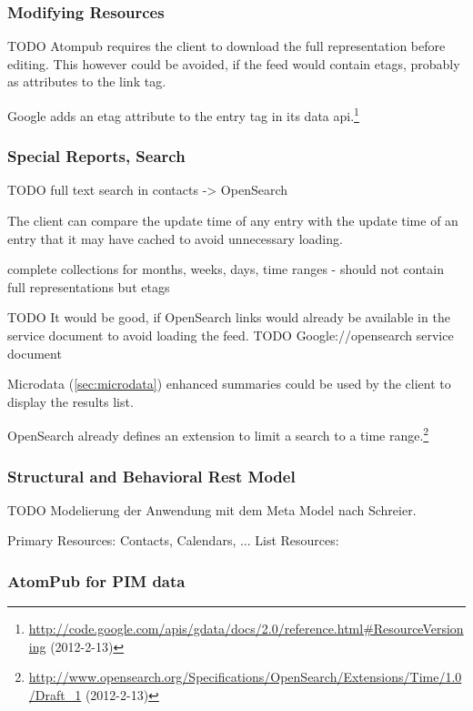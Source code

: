 \documentclass[12pt,a4paper]{scrartcl}		%
\newcommand{\citeurl}[2]{\url{#1} (#2)}
\begin{document}
\subsubsection{Modifying Resources}

TODO Atompub requires the client to download the full representation before
editing. This however could be avoided, if the feed would contain etags,
probably as attributes to the link tag.

Google adds an etag attribute to the entry tag in its data api.\footnote{\citeurl{http://code.google.com/apis/gdata/docs/2.0/reference.html\#ResourceVersioning}{2012-2-13}}

\subsubsection{Special Reports, Search}
TODO 
full text search in contacts -> OpenSearch

The client can compare the update time of any entry with the update time of an entry that it may have cached to avoid unnecessary loading.

complete collections \cite{RFC5005} for months, weeks, days, time ranges
 - should not contain full representations but etags

TODO It would be good, if OpenSearch links would already be available in the service document to avoid loading the feed.
TODO Google://opensearch service document

Microdata (\autoref{sec:microdata}) enhanced summaries could be used by the client to display the results list.

OpenSearch already defines an extension to limit a search to a time range.\footnote{\citeurl{http://www.opensearch.org/Specifications/OpenSearch/Extensions/Time/1.0/Draft_1}{2012-2-13}}

\subsubsection{Structural and Behavioral Rest Model}

TODO Modelierung der Anwendung mit dem Meta Model nach Schreier.

Primary Resources: Contacts, Calendars, ...
List Resources: 

\subsubsection{AtomPub for PIM data}
\end{document}
